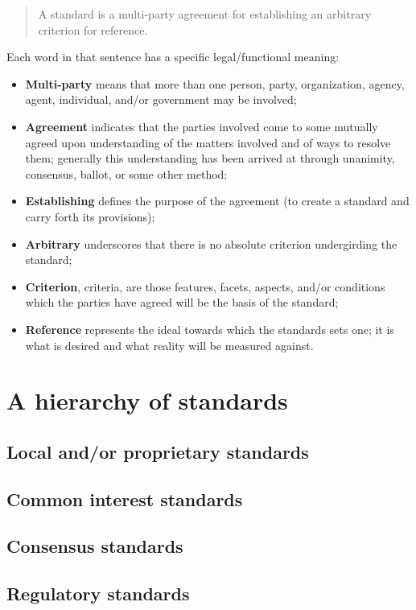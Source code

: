 \documentclass[11pt]{book}
\begin{document}
\begin{quote}
	A standard is a multi-party agreement for establishing an arbitrary criterion for reference.
\end{quote}
Each word in that sentence has a specific legal/functional meaning:
\begin{itemize}
	\item \textbf{Multi-party} means that more than one person, party, organization, agency, agent, individual, and/or government may be involved;
	\item \textbf{Agreement} indicates that the parties involved come to some mutually agreed upon understanding of the matters involved and of ways to resolve them; generally this understanding has been arrived at through unanimity, consensus, ballot, or some other method;
	\item \textbf{Establishing} defines the purpose of the agreement (to create a standard and carry forth its provisions);
	\item \textbf{Arbitrary} underscores that there is no absolute criterion undergirding the standard;
	\item \textbf{Criterion}, criteria, are those features, facets, aspects, and/or conditions which the parties have agreed will be the basis of the standard;
	\item \textbf{Reference} represents the ideal towards which the standards sets one; it is what is desired and what reality will be measured against.
\end{itemize}


\section{A hierarchy of standards}
\subsection{Local and/or proprietary standards}
\subsection{Common interest standards}
\subsection{Consensus standards}
\subsection{Regulatory standards}
\end{document}
